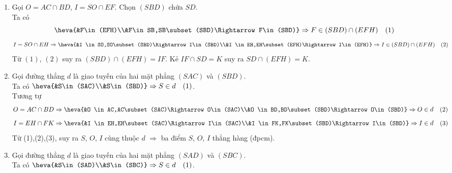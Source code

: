 \begin{bt}
{\begin{center}
		\end{center}
		\begin{enumerate}
			\item Gọi $O=AC\cap BD$, $I=SO\cap EF$. Chọn $(SBD)$ chứa $SD$.\\
			Ta có $$\heva{&F\in (EFH)\\&F\in SB,SB\subset (SBD)\Rightarrow F\in(SBD)}\Rightarrow F\in(SBD)\cap(EFH)\quad(1)$$ 
			$$I=SO\cap EH \Rightarrow \heva{&I \in SO,SO\subset (SBD)\Rightarrow I\in(SBD)\\&I \in EH,EH\subset (EFH)\Rightarrow I\in(EFH)}\Rightarrow I\in(SBD)\cap(EFH)\quad(2)$$	
			Từ $(1)$, $(2)$ suy ra $(SBD)\cap(EFH)=IF$. Kẻ $IF\cap SD=K$ suy ra $SD\cap(EFH)=K$.
			\item Gọi đường thẳng $d$ là giao tuyến của hai mặt phẳng $(SAC)$ và $(SBD)$.\\
			Ta có 
			$\heva{&S\in(SAC)\\&S\in(SBD)}\Rightarrow S\in d\quad (1)$.\\
			Tương tự
			$$O=AC\cap BD \Rightarrow \heva{&O \in AC,AC\subset (SAC)\Rightarrow O\in(SAC)\\&O \in BD,BD\subset (SBD)\Rightarrow O\in(SBD)}\Rightarrow O\in d\quad (2)$$
			$$I=EH\cap FK \Rightarrow \heva{&I \in EH,EH\subset (SAC)\Rightarrow I\in(SAC)\\&I \in FK,FK\subset (SBD)\Rightarrow I\in(SBD)}\Rightarrow I\in d\quad (3)$$
			Từ (1),(2),(3), suy ra $S$, $O$, $I$ cùng thuộc $d$ $\Rightarrow$ ba điểm $S$, $O$, $I$ thẳng hàng (đpcm).
			\item Gọi đường thẳng $d$ là giao tuyến của hai mặt phẳng $(SAD)$ và $(SBC)$.\\
			Ta có 
			$\heva{&S\in(SAD)\\&S\in(SBC)}\Rightarrow S\in d\quad (1)$.\\

\end{enumerate}}
\end{bt}
